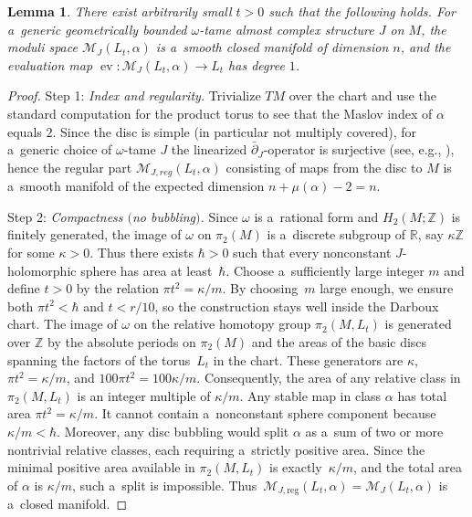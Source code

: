 \documentclass[10pt,a4paper]{amsart}
\numberwithin{equation}{section}
\newcommand{\ev}{\operatorname{ev}}
\newtheorem{lm}[Theorem]{Lemma}
\theoremstyle{definition}
\begin{document}
\begin{lm}\label{lem:degree-one}
There exist arbitrarily small $t > 0$ such that the following holds.
For a~generic geometrically bounded $\omega$-tame almost complex structure $J$ on $M$, the moduli space $\mathcal{M}_{J}(L_t,\alpha)$ is a~smooth closed manifold of dimension $n$, and the evaluation map $\ev\colon\mathcal{M}_{J}(L_t,\alpha)\to L_t$ has degree $1$.
\end{lm}
\begin{proof}
Step 1: \emph{Index and regularity.}
Trivialize $TM$ over the chart and use the standard computation for the product torus to see that the Maslov index of $\alpha$ equals $2$.
Since the disc is simple (in particular not multiply covered), for a~generic choice of $\omega$-tame $J$ the linearized $\bar\partial_J$-operator is surjective (see, e.g., \cite{McDuffSalamonJHol}), hence the regular part $\mathcal{M}_{J,reg}(L_t,\alpha)$ consisting of maps from the disc to $M$ is a~smooth manifold of the expected dimension $n+\mu(\alpha)-2=n$.

Step 2: \emph{Compactness $($no bubbling$)$.}
Since $\omega$ is a~rational form and $H_2(M; \mathbb{Z})$ is finitely generated, the image of $\omega$ on $\pi_2(M)$ is a~discrete subgroup of $\mathbb{R}$, say $\kappa\mathbb{Z}$ for some $\kappa > 0$. Thus there exists $\hbar > 0$ such that every nonconstant $J$-holomorphic sphere has area at least~$\hbar$. Choose a~sufficiently large integer $m$ and define $t > 0$ by the relation $\pi t^2 = \kappa / m$. By choosing~$m$ large enough, we ensure both $\pi t^2 < \hbar$ and $t < r/10$, so the construction stays well inside the Darboux chart. The image of $\omega$ on the relative homotopy group $\pi_2(M, L_t)$ is generated over $\mathbb{Z}$ by the absolute periods on $\pi_2(M)$ and the areas of the basic discs spanning the factors of the torus~$L_t$ in the chart. These generators are $\kappa$, $\pi t^2 = \kappa / m$, and $100\pi t^2 = 100\kappa / m$. Consequently, the area of any relative class in $\pi_2(M, L_t)$ is an integer multiple of $\kappa / m$.
 Any stable map in class $\alpha$ has total area $\pi t^2 = \kappa / m$. It cannot contain a~nonconstant sphere component because~${\kappa / m < \hbar}$. Moreover, any disc bubbling would split $\alpha$ as a~sum of two or more nontrivial relative classes, each requiring a~strictly positive area. Since the minimal positive area available in $\pi_2(M, L_t)$ is exactly~${\kappa / m}$, and the total area of $\alpha$ is $\kappa / m$, such a~split is impossible. Thus~${\mathcal{M}_{J,\text{reg}}(L_t, \alpha) = \mathcal{M}_J(L_t, \alpha)}$ is a~closed manifold.


\end{proof}
\end{document}
